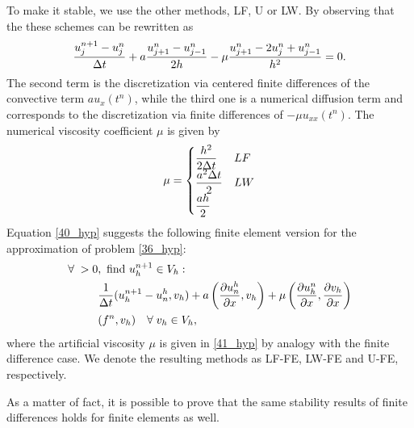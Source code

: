 To make it stable, we use the other methods, LF, U or LW.
By observing that the these schemes can be rewritten as 
\begin{equation}
    \frac{u_j^{n+1}-u^n_j}{\Delta t} + a \frac{u_{j+1}^{n}-u^n_{j-1}}{2h} - \mu \frac{u_{j+1}^{n}-2u^n_j+u^n_{j-1}}{h^2} = 0.
    \label{40_hyp}
\end{equation}
The second term is the discretization via centered finite differences of the convective term \(au_x(t^n)\), while the third one is a numerical diffusion term and corresponds to the discretization via finite differences of \(-\mu u_{xx}(t^n)\). The numerical viscosity coefficient \(\mu\) is given by 
\begin{equation}
    \mu = 
    \begin{cases}
        \dfrac{h^2}{2\Delta t} & LF \\
        \dfrac{a^2\Delta t}{2} & LW \\
        \dfrac{ah}{2}
    \end{cases}
    \label{41_hyp}
\end{equation}
Equation \eqref{40_hyp} suggests the following finite element version for the approximation of problem \eqref{36_hyp}:
\begin{equation}
    \begin{split}
        \forall \; > 0&, \ \find u^{n+1}_h \in V_h : \\
        &\frac{1}{\tstep} (u_h^{n+1}- u_n^h, v_h) + a\left( \partialderivative{u_n^h}{x}, v_h \right) + \mu \left( \partialderivative{u^n_h}{x}, \partialderivative{v_h}{x} \right) \\
        &(f^n,v_h) \quad \forall \; v_h \in V_h,
    \end{split}
    \label{42_hyp}
\end{equation}
where the artificial viscosity \(\mu\) is given in \eqref{41_hyp} by analogy with the finite difference case. We denote the resulting methods as LF-FE, LW-FE and U-FE, respectively. 

As a matter of fact, it is possible to prove that the same stability results of finite differences holds for finite elements as well. 
